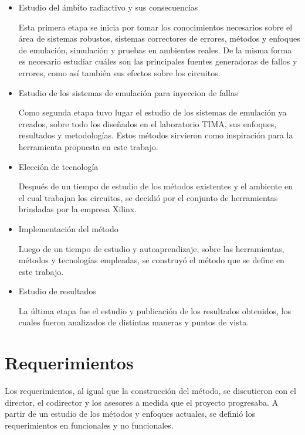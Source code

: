 \documentclass[a4paper,openright,12pt]{report}
\begin{document}
\begin{itemize}
\item Estudio del ámbito radiactivo y sus consecuencias

Esta primera etapa se inicia por tomar los conocimientos necesarios sobre el área de sistemas robustos, sistemas correctores de errores, métodos y enfoques de emulación, simulación y pruebas en ambientes reales. De la misma forma es necesario estudiar cuáles son las principales fuentes generadoras de fallos y errores, como así también sus efectos sobre los circuitos.

\item Estudio de los sistemas de emulación para inyeccion de fallas

Como segunda etapa tuvo lugar el estudio de los sistemas de emulación ya creados, sobre todo los diseñados en el laboratorio TIMA, sus enfoques, resultados y metodologías. Estos métodos sirvieron como inspiración para la herramienta propuesta en este trabajo.

\item Elección de tecnología

Después de un tiempo de  estudio de los métodos existentes y el ambiente en el cual trabajan los circuitos, se decidió por  el conjunto de  herramientas brindadas por la empresa  Xilinx.

\item Implementación  del método

Luego de un tiempo de estudio y autoaprendizaje, sobre las herramientas, métodos y tecnologías empleadas, se construyó el método que se define en este trabajo.

\item Estudio de resultados

La última etapa fue el estudio y publicación de los resultados obtenidos, los cuales fueron analizados de distintas maneras y puntos de vista.











\end{itemize}



\section{Requerimientos}

Los requerimientos,  al igual que la construcción del método, se discutieron con el director, el codirector y los asesores a medida que el proyecto progresaba. A partir de un estudio de los métodos y enfoques actuales, se definió los requerimientos en funcionales y  no funcionales.
\end{document}
